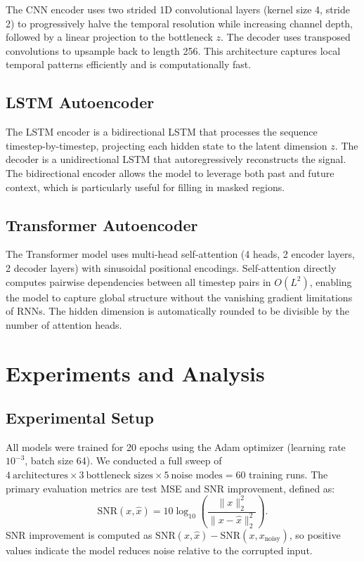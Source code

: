 \documentclass{article}
\begin{document}
The CNN encoder uses two strided 1D convolutional layers (kernel size 4, stride 2) to
progressively halve the temporal resolution while increasing channel depth, followed by a
linear projection to the bottleneck $z$. The decoder uses transposed convolutions to
upsample back to length 256. This architecture captures local temporal patterns
efficiently and is computationally fast.

\subsection{LSTM Autoencoder}

The LSTM encoder is a bidirectional LSTM that processes the sequence timestep-by-timestep,
projecting each hidden state to the latent dimension $z$. The decoder is a unidirectional
LSTM that autoregressively reconstructs the signal. The bidirectional encoder allows the
model to leverage both past and future context, which is particularly useful for filling
in masked regions.

\subsection{Transformer Autoencoder}

The Transformer model uses multi-head self-attention (4 heads, 2 encoder layers, 2 decoder
layers) with sinusoidal positional encodings. Self-attention directly computes pairwise
dependencies between all timestep pairs in $O(L^2)$, enabling the model to capture global
structure without the vanishing gradient limitations of RNNs. The hidden dimension is
automatically rounded to be divisible by the number of attention heads.

\section{Experiments and Analysis}

\subsection{Experimental Setup}

All models were trained for 20 epochs using the Adam optimizer (learning rate $10^{-3}$,
batch size 64). We conducted a full sweep of
$4\ \text{architectures} \times 3\ \text{bottleneck sizes} \times 5\ \text{noise modes}
= 60$ training runs. The primary evaluation metrics are test MSE and SNR improvement,
defined as:
\begin{equation}
    \text{SNR}(x, \hat{x}) = 10 \log_{10}\!\left(\frac{\|x\|_{2}^2}{\|x - \hat{x}\|_{2}^2}\right).
\end{equation}
SNR improvement is computed as $\text{SNR}(x,\hat{x}) - \text{SNR}(x, x_{\text{noisy}})$,
so positive values indicate the model reduces noise relative to the corrupted input.
\end{document}
